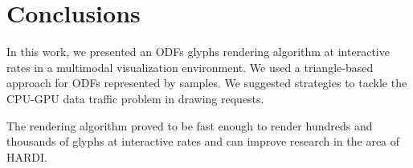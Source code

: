 \documentclass[twoside,twocolumn,10pt]{article}
\begin{document}














\section{Conclusions}
\label{sec::conclusions}

In this work, we presented an ODFs glyphs rendering algorithm at interactive rates in a multimodal visualization environment. We used a triangle-based approach for ODFs represented by samples. We suggested strategies to tackle the CPU-GPU data traffic problem in drawing requests.

The rendering algorithm proved to be fast enough to render hundreds and thousands of glyphs at interactive rates and can improve research in the area of HARDI.


\end{document}
